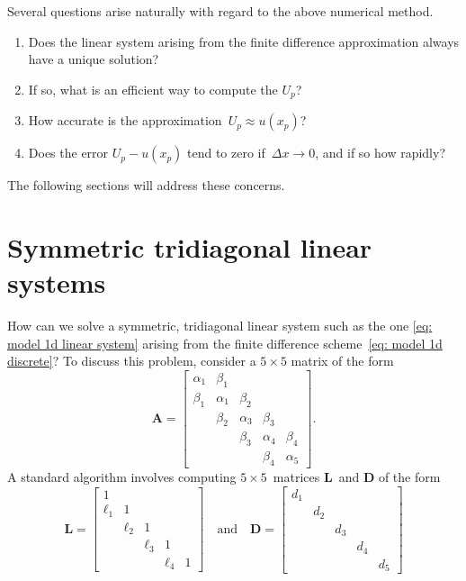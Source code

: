 Several questions arise naturally with regard to the above numerical method.
\begin{enumerate}
\item Does the linear system arising from the finite difference approximation 
always have a unique solution?
\item If so, what is an efficient way to compute the $U_p$?
\item How accurate is the approximation~$U_p\approx u(x_p)$?
\item Does the error $U_p-u(x_p)$ tend to zero if~$\Delta x\to0$, and if so how 
rapidly?
\end{enumerate}
The following sections will address these concerns.

\section{Symmetric tridiagonal linear systems}
\label{sec: sym tridiagonal}
How can we solve a symmetric, tridiagonal linear system such as the one
\eqref{eq: model 1d linear system} arising from the finite difference 
scheme~\eqref{eq: model 1d discrete}?  To discuss this problem, consider a 
$5\times5$ matrix of the form
\begin{equation}\label{eq: A symm tridiagonal}
\boldsymbol{A}=\begin{bmatrix}
\alpha_1& \beta_1&        &        &\\
 \beta_1&\alpha_1& \beta_2&        &\\
        & \beta_2&\alpha_3&\beta_3 &\\
        &        & \beta_3&\alpha_4&\beta_4\\
        &        &        & \beta_4&\alpha_5
\end{bmatrix}.
\end{equation}
A standard algorithm involves computing $5\times5$~matrices 
$\boldsymbol{L}$~and $\boldsymbol{D}$ of the form
\[
\boldsymbol{L}=\begin{bmatrix}
     1&      &      &      &\\
\ell_1&     1&      &      &\\
      &\ell_2&     1&      &\\
      &      &\ell_3&     1&\\
      &      &      &\ell_4&1
  \end{bmatrix}
\quad\text{and}\quad
\boldsymbol{D}=\begin{bmatrix}
d_1&   &   &   &\\
   &d_2&   &   &\\
   &   &d_3&   &\\
   &   &   &d_4&\\
   &   &   &   &d_5
  \end{bmatrix}
\]
